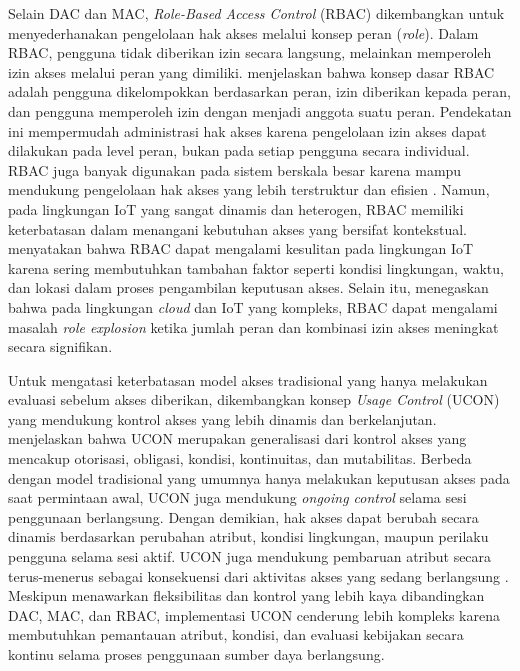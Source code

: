 Selain DAC dan MAC, \textit{Role-Based Access Control} (RBAC) dikembangkan untuk menyederhanakan pengelolaan hak akses melalui konsep peran (\textit{role}). Dalam RBAC, pengguna tidak diberikan izin secara langsung, melainkan memperoleh izin akses melalui peran yang dimiliki. \textcite{ferraiolo_proposed_2001} menjelaskan bahwa konsep dasar RBAC adalah pengguna dikelompokkan berdasarkan peran, izin diberikan kepada peran, dan pengguna memperoleh izin dengan menjadi anggota suatu peran. Pendekatan ini mempermudah administrasi hak akses karena pengelolaan izin akses dapat dilakukan pada level peran, bukan pada setiap pengguna secara individual. RBAC juga banyak digunakan pada sistem berskala besar karena mampu mendukung pengelolaan hak akses yang lebih terstruktur dan efisien \parencite{ferraiolo_proposed_2001}. Namun, pada lingkungan IoT yang sangat dinamis dan heterogen, RBAC memiliki keterbatasan dalam menangani kebutuhan akses yang bersifat kontekstual. \textcite{diaz_authorization_2025} menyatakan bahwa RBAC dapat mengalami kesulitan pada lingkungan IoT karena sering membutuhkan tambahan faktor seperti kondisi lingkungan, waktu, dan lokasi dalam proses pengambilan keputusan akses. Selain itu, \textcite{ameer_hybrid_2023} menegaskan bahwa pada lingkungan \textit{cloud} dan IoT yang kompleks, RBAC dapat mengalami masalah \textit{role explosion} ketika jumlah peran dan kombinasi izin akses meningkat secara signifikan.

Untuk mengatasi keterbatasan model akses tradisional yang hanya melakukan evaluasi sebelum akses diberikan, dikembangkan konsep \textit{Usage Control} (UCON) yang mendukung kontrol akses yang lebih dinamis dan berkelanjutan. \textcite{park_uconabc_2004} menjelaskan bahwa UCON merupakan generalisasi dari kontrol akses yang mencakup otorisasi, obligasi, kondisi, kontinuitas, dan mutabilitas. Berbeda dengan model tradisional yang umumnya hanya melakukan keputusan akses pada saat permintaan awal, UCON juga mendukung \textit{ongoing control} selama sesi penggunaan berlangsung. Dengan demikian, hak akses dapat berubah secara dinamis berdasarkan perubahan atribut, kondisi lingkungan, maupun perilaku pengguna selama sesi aktif. UCON juga mendukung pembaruan atribut secara terus-menerus sebagai konsekuensi dari aktivitas akses yang sedang berlangsung \parencite{park_uconabc_2004}. Meskipun menawarkan fleksibilitas dan kontrol yang lebih kaya dibandingkan DAC, MAC, dan RBAC, implementasi UCON cenderung lebih kompleks karena membutuhkan pemantauan atribut, kondisi, dan evaluasi kebijakan secara kontinu selama proses penggunaan sumber daya berlangsung.

